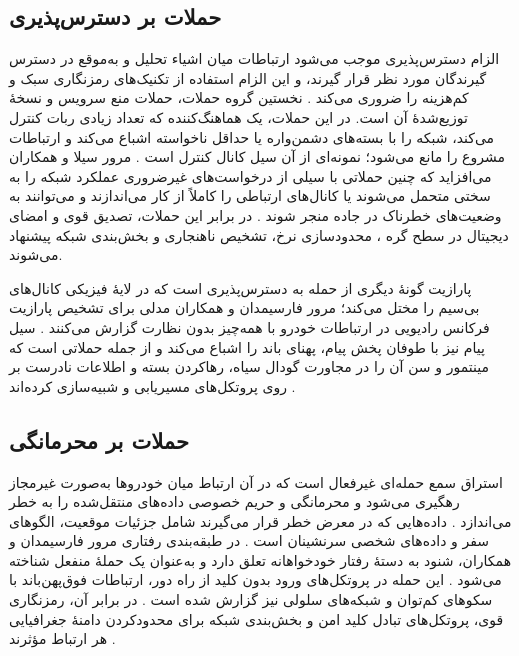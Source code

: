 \subsection{حملات بر دسترس‌پذیری}

الزام دسترس‌پذیری موجب می‌شود ارتباطات میان اشیاء  تحلیل و به‌موقع در دسترس گیرندگان مورد نظر قرار گیرند، و این الزام استفاده از تکنیک‌های رمزنگاری سبک و کم‌هزینه را ضروری می‌کند \cite{farsimadanReviewSecurityChallenges2025}. نخستین گروه حملات، حملات منع سرویس  و نسخهٔ توزیع‌شدهٔ آن است. در این حملات، یک هماهنگ‌کننده که تعداد زیادی ربات کنترل می‌کند، شبکه را با بسته‌های دشمن‌واره یا حداقل ناخواسته اشباع می‌کند \cite{farsimadanReviewSecurityChallenges2025} و ارتباطات مشروع را مانع می‌شود؛ نمونه‌ای از آن سیل کانال کنترل است \cite{farsimadanReviewSecurityChallenges2025}. مرور سیلا و همکاران می‌افزاید که چنین حملاتی با سیلی از درخواست‌های غیرضروری عملکرد شبکه را به سختی متحمل می‌شوند یا کانال‌های ارتباطی را کاملاً از کار می‌اندازند و می‌توانند به وضعیت‌های خطرناک در جاده منجر شوند \cite{VanetSecurityPrivacy}. در برابر این حملات، تصدیق قوی و امضای دیجیتال در سطح گره \cite{farsimadanReviewSecurityChallenges2025}، محدودسازی نرخ، تشخیص ناهنجاری و بخش‌بندی شبکه \cite{VanetSecurityPrivacy} پیشنهاد می‌شوند.

پارازیت  گونهٔ دیگری از حمله به دسترس‌پذیری است که در لایهٔ فیزیکی کانال‌های بی‌سیم را مختل می‌کند؛ مرور فارسیمدان و همکاران مدلی برای تشخیص پارازیت فرکانس رادیویی در ارتباطات خودرو با همه‌چیز بدون نظارت گزارش می‌کنند \cite{farsimadanReviewSecurityChallenges2025}. سیل پیام  نیز با طوفان پخش پیام، پهنای باند را اشباع می‌کند و از جمله حملاتی است که مینتمور و سن آن را در مجاورت گودال سیاه، رهاکردن بسته و اطلاعات نادرست بر روی پروتکل‌های مسیریابی  و  شبیه‌سازی کرده‌اند \cite{VanetSecurityPrivacy}.

\subsection{حملات بر محرمانگی}

استراق سمع  حمله‌ای غیرفعال است که در آن ارتباط میان خودروها به‌صورت غیرمجاز رهگیری می‌شود و محرمانگی و حریم خصوصی داده‌های منتقل‌شده را به خطر می‌اندازد \cite{VanetSecurityPrivacy}. داده‌هایی که در معرض خطر قرار می‌گیرند شامل جزئیات موقعیت، الگوهای سفر و داده‌های شخصی سرنشینان است \cite{VanetSecurityPrivacy}. در طبقه‌بندی رفتاری مرور فارسیمدان و همکاران، شنود به دستهٔ رفتار خودخواهانه تعلق دارد و به‌عنوان یک حملهٔ منفعل شناخته می‌شود \cite{farsimadanReviewSecurityChallenges2025}. این حمله در پروتکل‌های ورود بدون کلید از راه دور، ارتباطات فوق‌پهن‌باند با سکوهای کم‌توان و شبکه‌های سلولی نیز گزارش شده است \cite{farsimadanReviewSecurityChallenges2025}. در برابر آن، رمزنگاری قوی، پروتکل‌های تبادل کلید امن و بخش‌بندی شبکه برای محدودکردن دامنهٔ جغرافیایی هر ارتباط مؤثرند \cite{VanetSecurityPrivacy}.

